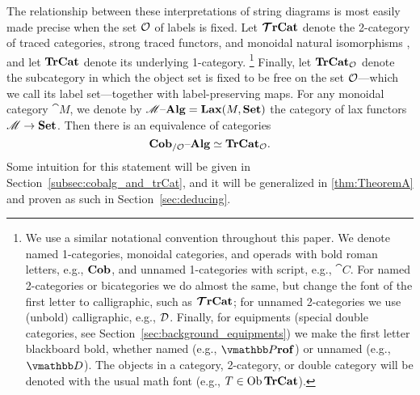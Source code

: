 \documentclass[12pt,oneside,article,draft]{memoir}
\begin{document}
The relationship between these interpretations of string diagrams is most easily made precise when
the set $\mathcal{O}$ of labels is fixed. Let $\bm{\mathcal{T}}\mathbf{rCat}$ denote the 2-category of traced categories,
strong traced functors, and monoidal natural isomorphisms \cite{HK}, and let $\mathbf{TrCat}$ denote its
underlying 1-category.%
\footnote{
   We use a similar notational convention throughout this paper. We denote named 1-categories,
   monoidal categories, and operads with bold roman letters, e.g., $\mathbf{Cob}$, and unnamed
   1-categories with script, e.g., $\cat{C}$. For named 2-categories or bicategories we do almost
   the same, but change the font of the first letter to calligraphic, such as $\bm{\mathcal{T}}\mathbf{rCat}$; for
   unnamed 2-categories we use (unbold) calligraphic, e.g., $\mathcal{D}$. Finally, for equipments
   (special double categories, see Section~\ref{sec:background_equipments}) we make the first letter
   blackboard bold, whether named (e.g., $\ndcat{P}{rof}$) or unnamed (e.g., $\dcat{D}$). The
   objects in a category, 2-category, or double category will be denoted with the usual math font
   (e.g., $T\in\operatorname{Ob}\mathbf{TrCat}$).
}
Finally, let $\mathbf{TrCat}_{\mathcal{O}}$ denote the subcategory in which the object set is fixed to be free
on the set $\mathcal{O}$---which we call its label set---together with label-preserving maps. For any
monoidal category $\cat{M}$, we denote by $\mathscr{M}{\text \textendash}\mathbf{Alg}=\mathbf{Lax}(M,\mathbf{Set})$ the category of lax
functors $\mathscr{M}\to\mathbf{Set}$. Then there is an equivalence of categories
\begin{equation}\label{eq:single_fiber}
   \mathbf{Cob}_{/\mathcal{O}}{\text \textendash}\mathbf{Alg}\simeq\mathbf{TrCat}_{\mathcal{O}}.
\end{equation}
Some intuition for this statement will be given in Section~\ref{subsec:cobalg_and_trCat}, and it
will be generalized in \ref{thm:TheoremA} and proven as such in Section~\ref{sec:deducing}.


\end{document}
